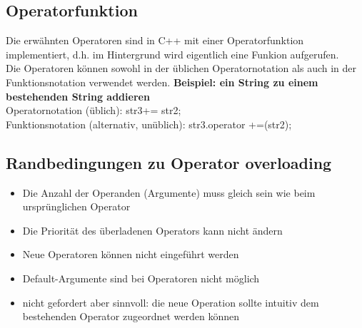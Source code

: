 \subsection{Operatorfunktion}
Die erwähnten Operatoren sind in C++ mit einer Operatorfunktion implementiert, d.h. im Hintergrund wird eigentlich eine Funkion aufgerufen.\\
Die Operatoren können sowohl in der üblichen Operatornotation als auch in der Funktionsnotation verwendet werden.
\vspace{\baselineskip}
\textbf{Beispiel: ein String zu einem bestehenden String addieren}\\
Operatornotation (üblich): str3+= str2;\\
\vspace{\baselineskip}
Funktionsnotation (alternativ, unüblich): str3.operator +=(str2);

\subsection{Randbedingungen zu Operator overloading}
\begin{itemize}
	\item Die Anzahl der Operanden (Argumente) muss gleich sein wie beim ursprünglichen Operator
	\item Die Priorität des überladenen Operators kann nicht ändern
	\item Neue Operatoren können nicht eingeführt werden
	\item Default-Argumente sind bei Operatoren nicht möglich
	\item nicht gefordert aber sinnvoll: die neue Operation sollte intuitiv dem bestehenden Operator zugeordnet werden können
\end{itemize}
\vspace{\baselineskip}
